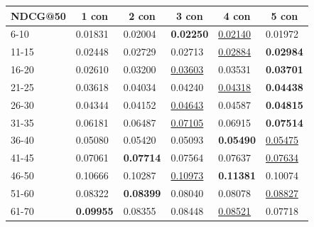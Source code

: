 \begin{table}[]
    \centering
    \begin{tabular}{|l|l|l|l|l|l|}
        \hline
        NDCG@50   & \multicolumn{1}{c|}{1 con} & \multicolumn{1}{c|}{2 con} & \multicolumn{1}{c|}{3 con} & \multicolumn{1}{c|}{4 con} & \multicolumn{1}{c|}{5 con} \\ \hline
        6-10      & 0.01831                    & 0.02004                    & \textbf{0.02250}           & \underline{0.02140}        & 0.01972                    \\ \hline
        11-15     & 0.02448                    & 0.02729                    & 0.02713                    & \underline{0.02884}        & \textbf{0.02984}           \\ \hline
        16-20     & 0.02610                    & 0.03200                    & \underline{0.03603}        & 0.03531                    & \textbf{0.03701}           \\ \hline
        21-25     & 0.03618                    & 0.04034                    & 0.04240                    & \underline{0.04318}        & \textbf{0.04438}           \\ \hline
        26-30     & 0.04344                    & 0.04152                    & \underline{0.04643}        & 0.04587                    & \textbf{0.04815}           \\ \hline
        31-35     & 0.06181                    & 0.06487                    & \underline{0.07105}        & 0.06915                    & \textbf{0.07514}           \\ \hline
        36-40     & 0.05080                    & 0.05420                    & 0.05093                    & \textbf{0.05490}           & \underline{0.05475}        \\ \hline
        41-45     & 0.07061                    & \textbf{0.07714}           & 0.07564                    & 0.07637                    & \underline{0.07634}        \\ \hline
        46-50     & 0.10666                    & 0.10287                    & \underline{0.10973}        & \textbf{0.11381}           & 0.10074                    \\ \hline
        51-60     & 0.08322                    & \textbf{0.08399}           & 0.08040                    & 0.08078                    & \underline{0.08827}        \\ \hline
        61-70     & \textbf{0.09955}           & 0.08355                    & 0.08448                    & \underline{0.08521}        & 0.07718                    \\ \hline

\end{tabular}
\end{table}
